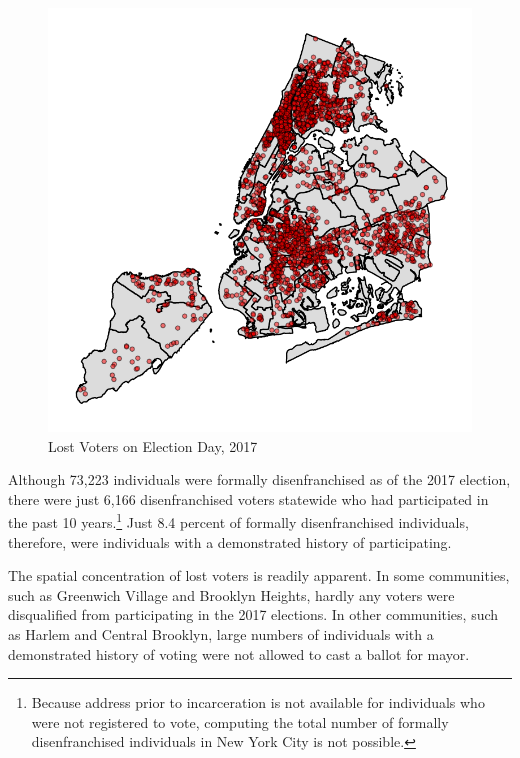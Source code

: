 \documentclass[
  12pt,
]{article}
\begin{document}
\begin{figure}[H]

{\centering \includegraphics{felony_disenfranchisement_nys_files/figure-latex/citywide-map-1} 

}

\caption{\label{fig:citymap}Lost Voters on Election Day, 2017}\label{fig:citywide-map}
\end{figure}

Although 73,223 individuals were formally disenfranchised as of the 2017 election, there were just 6,166 disenfranchised voters statewide who had participated in the past 10 years.\footnote{Because address prior to incarceration is not available for individuals who were not registered to vote, computing the total number of formally disenfranchised individuals in New York City is not possible.} Just 8.4 percent of formally disenfranchised individuals, therefore, were individuals with a demonstrated history of participating.

The spatial concentration of lost voters is readily apparent. In some communities, such as Greenwich Village and Brooklyn Heights, hardly any voters were disqualified from participating in the 2017 elections. In other communities, such as Harlem and Central Brooklyn, large numbers of individuals with a demonstrated history of voting were not allowed to cast a ballot for mayor.
\end{document}

